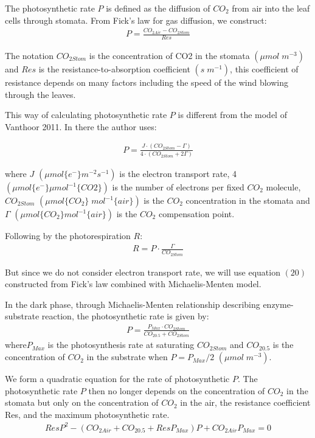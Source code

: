 \documentclass[a4paper]{article}
\numberwithin{equation}{section}
\begin{document}
The photosynthetic rate \(P\) is defined as the diffusion of \(CO_2\) from air into the leaf cells through stomata. From Fick's law for gas diffusion, we construct:
\begin{gather}
  P = \frac{CO_{2Air} - CO_{2Stom}}{Res}
\end{gather}

The notation \(CO_{2Stom}\) is the concentration of CO2 in the stomata \((\mu mol\;m^{-3})\) and \(Res\) is the resistance-to-absorption coefficient \((s\;m^{-1})\), this coefficient of resistance depends on many factors including the speed of the wind blowing through the leaves.

This way of calculating photosynthetic rate \(P\) is different from the model of Vanthoor 2011. In there the author uses:

\begin{gather}
  P = \frac{J \cdot (CO_{2Stom} - \Gamma)}{4 \cdot (CO_{2Stom} + 2\Gamma)}
\end{gather}

where \(J\) \((\mu mol \{e^-\} m^{-2} s^{-1})\) is the electron transport rate, 4 \((\mu mol \{e^-\} \mu mol^{-1} \{CO2\})\) is the
number of electrons per fixed \(CO_2\) molecule, \(CO_{2Stom}\) \((\mu mol\{CO_2\}\;mol^{-1}\{air\})\) is the \(CO_2\) concentration in the stomata and \(\Gamma\) \((\mu mol \{CO_2\} mol^{-1} \{air\})\) is the \(CO_2\) compensation point.

Following by the photorespiration \(R\):
\begin{gather}
  R = P \cdot \frac{\Gamma}{CO_{2Stom}}
\end{gather}

But since we do not consider electron transport rate, we will use equation $(20)$ constructed from Fick's law combined with Michaelis-Menten model.

In the dark phase, through Michaelis-Menten relationship describing enzyme-substrate reaction, the photosynthetic rate is given by:
\begin{gather}
  P = \frac{P_{Max} \cdot CO_{2Stom}}{CO_{2 0.5} + CO_{2Stom}}
\end{gather}
where\(P_{Max}\) is the photosynthesis rate at saturating \(CO_{2Stom}\) and \(CO_{2 0.5}\) is the concentration of \(CO_2\) in the substrate when \(P = P_{Max}/2\) \((\mu mol\;m^{-3})\).

 We form a quadratic equation for the rate of photosynthetic \(P\). The photosynthetic rate \(P\) then no longer depends on the concentration of \(CO_2\) in the stomata but only on the concentration of \(CO_2\) in the air, the resistance coefficient Res, and the maximum photosynthetic rate.
\begin{gather}
  ResP^2 - (CO_{2Air} + CO_{2 0.5} + ResP_{Max})P + CO_{2Air}P_{Max} = 0
\end{gather}
\end{document}
